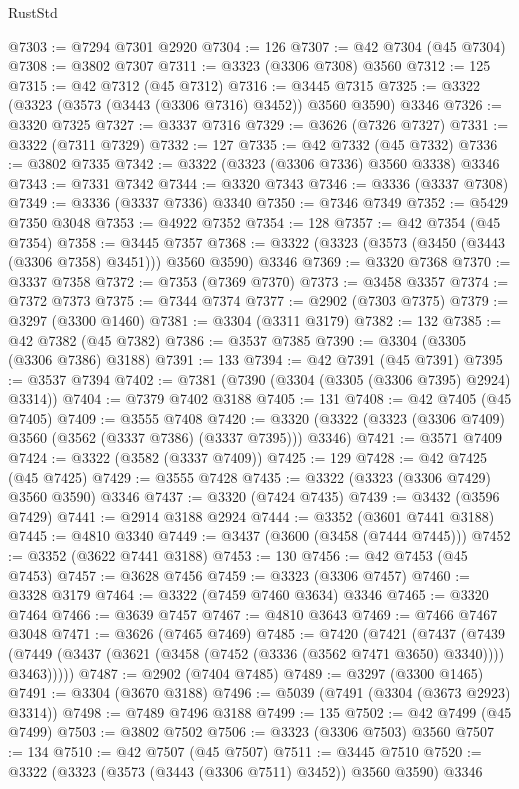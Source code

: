 \begin{lexlean}{RustStd}
\begin{coremodule}
@7303 := @7294 @7301 @2920
@7304 := 126
@7307 := @42 @7304 (@45 @7304)
@7308 := @3802 @7307
@7311 := @3323 (@3306 @7308) @3560
@7312 := 125
@7315 := @42 @7312 (@45 @7312)
@7316 := @3445 @7315
@7325 := @3322 (@3323 (@3573 (@3443 (@3306 @7316) @3452)) @3560 @3590) @3346
@7326 := @3320 @7325
@7327 := @3337 @7316
@7329 := @3626 (@7326 @7327)
@7331 := @3322 (@7311 @7329)
@7332 := 127
@7335 := @42 @7332 (@45 @7332)
@7336 := @3802 @7335
@7342 := @3322 (@3323 (@3306 @7336) @3560 @3338) @3346
@7343 := @7331 @7342
@7344 := @3320 @7343
@7346 := @3336 (@3337 @7308)
@7349 := @3336 (@3337 @7336) @3340
@7350 := @7346 @7349
@7352 := @5429 @7350 @3048
@7353 := @4922 @7352
@7354 := 128
@7357 := @42 @7354 (@45 @7354)
@7358 := @3445 @7357
@7368 := @3322 (@3323 (@3573 (@3450 (@3443 (@3306 @7358) @3451))) @3560 @3590) @3346
@7369 := @3320 @7368
@7370 := @3337 @7358
@7372 := @7353 (@7369 @7370)
@7373 := @3458 @3357
@7374 := @7372 @7373
@7375 := @7344 @7374
@7377 := @2902 (@7303 @7375)
@7379 := @3297 (@3300 @1460)
@7381 := @3304 (@3311 @3179)
@7382 := 132
@7385 := @42 @7382 (@45 @7382)
@7386 := @3537 @7385
@7390 := @3304 (@3305 (@3306 @7386) @3188)
@7391 := 133
@7394 := @42 @7391 (@45 @7391)
@7395 := @3537 @7394
@7402 := @7381 (@7390 (@3304 (@3305 (@3306 @7395) @2924) @3314))
@7404 := @7379 @7402 @3188
@7405 := 131
@7408 := @42 @7405 (@45 @7405)
@7409 := @3555 @7408
@7420 := @3320 (@3322 (@3323 (@3306 @7409) @3560 (@3562 (@3337 @7386) (@3337 @7395))) @3346)
@7421 := @3571 @7409
@7424 := @3322 (@3582 (@3337 @7409))
@7425 := 129
@7428 := @42 @7425 (@45 @7425)
@7429 := @3555 @7428
@7435 := @3322 (@3323 (@3306 @7429) @3560 @3590) @3346
@7437 := @3320 (@7424 @7435)
@7439 := @3432 (@3596 @7429)
@7441 := @2914 @3188 @2924
@7444 := @3352 (@3601 @7441 @3188)
@7445 := @4810 @3340
@7449 := @3437 (@3600 (@3458 (@7444 @7445)))
@7452 := @3352 (@3622 @7441 @3188)
@7453 := 130
@7456 := @42 @7453 (@45 @7453)
@7457 := @3628 @7456
@7459 := @3323 (@3306 @7457)
@7460 := @3328 @3179
@7464 := @3322 (@7459 @7460 @3634) @3346
@7465 := @3320 @7464
@7466 := @3639 @7457
@7467 := @4810 @3643
@7469 := @7466 @7467 @3048
@7471 := @3626 (@7465 @7469)
@7485 := @7420
    (@7421
      (@7437
        (@7439 (@7449 (@3437 (@3621 (@3458 (@7452 (@3336 (@3562 @7471 @3650) @3340)))) @3463)))))
@7487 := @2902 (@7404 @7485)
@7489 := @3297 (@3300 @1465)
@7491 := @3304 (@3670 @3188)
@7496 := @5039 (@7491 (@3304 (@3673 @2923) @3314))
@7498 := @7489 @7496 @3188
@7499 := 135
@7502 := @42 @7499 (@45 @7499)
@7503 := @3802 @7502
@7506 := @3323 (@3306 @7503) @3560
@7507 := 134
@7510 := @42 @7507 (@45 @7507)
@7511 := @3445 @7510
@7520 := @3322 (@3323 (@3573 (@3443 (@3306 @7511) @3452)) @3560 @3590) @3346

\end{coremodule}
\end{lexlean}
